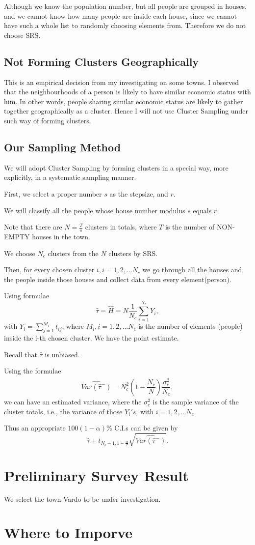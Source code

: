 \documentclass[12pt]{article}%
\begin{document}
Although we know the population number, but all people are grouped in houses, and we cannot know how many people are inside each house,
since we cannot have such a whole list to randomly choosing elements from. Therefore we do not choose SRS.

\subsection{Not Forming Clusters Geographically}
This is an empirical decision from my investigating on some towns. I observed that the neighbourhoods of a person is likely to have similar economic status with him.
In other words, people sharing similar economic status are likely to gather together geographically as a cluster. Hence I will not use Cluster Sampling under such way of forming clusters.

\subsection{Our Sampling Method}
We will adopt Cluster Sampling by forming clusters in a special way, more explicitly, in a systematic sampling manner.

First, we select a proper number $s$ as the stepsize, and $r$.

We will classify all the people whose house number modulus $s$ equals $r$.

Note that there are $N=\frac{T}{s}$ clusters in totals, where $T$ is the number of NON-EMPTY houses in the town.

We choose $N_c$ clusters from the $N$ clusters by SRS.

Then, for every chosen cluster $i, i=1,2,\dots N_c$ we go through all the houses and the people inside those houses and collect data from every element(person).

Using formulae $$\hat{\tau}=\hat{H}=N\frac{1}{N_c}\sum_{i=1}^{N_c}Y_i,$$ with $Y_i=\sum_{j=1}^{M_i}t_{ij}$, where $M_i, i=1,2,\dots N_c$ is the number of elements (people) inside the i-th chosen cluster. We have the point estimate.

Recall that $\hat{\tau}$ is unbiased.

Using the formulae 
$$\hat{Var(\hat{\tau~~~})  }=N_c^2(1-\frac{N_c}{N})\frac{\hat{\sigma_{c}^2}}{N_c},$$ we can have an estimated variance, where the $\hat{\sigma_{c}^2}$ is the sample variance of the cluster totals, i.e., the variance of those $Y_i's$, with $i=1,2,\dots N_c.$

Thus an appropriate $100(1-\alpha)\%$ C.I.s can be given by $$\hat{\tau} \pm t_{N_c-1,1-\frac{\alpha}{2}}\sqrt{\hat{Var(\hat{\tau~~~})  }}.$$


\section{Preliminary Survey Result}

We select the town Vardo to be under investigation. 



\section{Where to Imporve}
\end{document}
